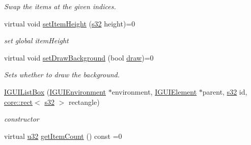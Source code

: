 \begin{DoxyCompactItemize}
\begin{DoxyCompactList}\small\item\em Swap the items at the given indices. \end{DoxyCompactList}\item 
\mbox{\label{classirr_1_1gui_1_1IGUIListBox_a83fb9c6f32039a39197cf799dd5e0c8f}} 
virtual void \hyperlink{classirr_1_1gui_1_1IGUIListBox_a83fb9c6f32039a39197cf799dd5e0c8f}{set\+Item\+Height} (\hyperlink{namespaceirr_ac66849b7a6ed16e30ebede579f9b47c6}{s32} height)=0
\begin{DoxyCompactList}\small\item\em set global item\+Height \end{DoxyCompactList}\item 
\mbox{\label{classirr_1_1gui_1_1IGUIListBox_ad323fdf0b083dbc1870d7fa5869cff8f}} 
virtual void \hyperlink{classirr_1_1gui_1_1IGUIListBox_ad323fdf0b083dbc1870d7fa5869cff8f}{set\+Draw\+Background} (bool \hyperlink{classirr_1_1gui_1_1IGUIElement_a1ef7eeaff67b8a9f4f37cacdc7e54be2}{draw})=0
\begin{DoxyCompactList}\small\item\em Sets whether to draw the background. \end{DoxyCompactList}\item 
\mbox{\label{classirr_1_1gui_1_1IGUIListBox_a6f6e6a84f3d2035a0874eb9f4a4d52ef}} 
\hyperlink{classirr_1_1gui_1_1IGUIListBox_a6f6e6a84f3d2035a0874eb9f4a4d52ef}{I\+G\+U\+I\+List\+Box} (\hyperlink{classirr_1_1gui_1_1IGUIEnvironment}{I\+G\+U\+I\+Environment} $\ast$environment, \hyperlink{classirr_1_1gui_1_1IGUIElement}{I\+G\+U\+I\+Element} $\ast$parent, \hyperlink{namespaceirr_ac66849b7a6ed16e30ebede579f9b47c6}{s32} id, \hyperlink{classirr_1_1core_1_1rect}{core\+::rect}$<$ \hyperlink{namespaceirr_ac66849b7a6ed16e30ebede579f9b47c6}{s32} $>$ rectangle)
\begin{DoxyCompactList}\small\item\em constructor \end{DoxyCompactList}\item 
\mbox{\label{classirr_1_1gui_1_1IGUIListBox_a9ae7e4858dd1dee26efab7e7c9c94ab7}} 
virtual \hyperlink{namespaceirr_a0416a53257075833e7002efd0a18e804}{u32} \hyperlink{classirr_1_1gui_1_1IGUIListBox_a9ae7e4858dd1dee26efab7e7c9c94ab7}{get\+Item\+Count} () const =0

\end{DoxyCompactItemize}
